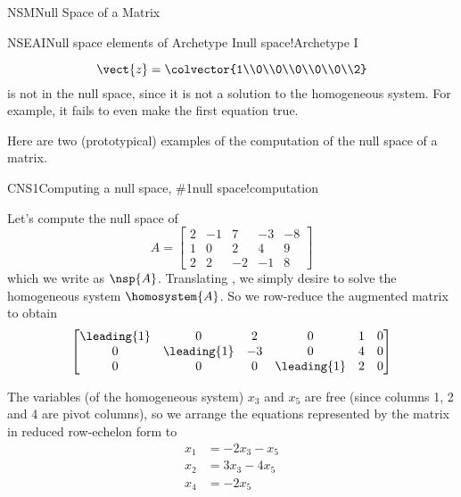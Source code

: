 \begin{subsect}{NSM}{Null Space of a Matrix}
\begin{example}{NSEAI}{Null space elements of Archetype I}{null space!Archetype I}
\begin{para}
%
\begin{equation*}
\vect{z}=\colvector{1\\0\\0\\0\\0\\0\\2}
\end{equation*}
%
is not in the null space, since it is not a solution to the homogeneous system.  For example, it fails to even make the first equation true.\end{para}
%
\end{example}
%
\begin{para}Here are two (prototypical) examples of the computation of the null space of a matrix.\end{para}
%
\begin{example}{CNS1}{Computing a null space, \protect\#1}{null space!computation}
\begin{para}Let's compute the null space of
%
\begin{equation*}
A=\begin{bmatrix}
 2 & -1 & 7 & -3 & -8 \\
 1 & 0 & 2 & 4 & 9 \\
 2 & 2 & -2 & -1 & 8
\end{bmatrix}
\end{equation*}
%
which we write as $\nsp{A}$.   Translating , we simply desire to solve the homogeneous system $\homosystem{A}$.  So we row-reduce the augmented matrix to obtain
%
\begin{equation*}
\begin{bmatrix}
 \leading{1} & 0 & 2 & 0 & 1 & 0 \\
 0 & \leading{1} & -3 & 0 & 4 & 0 \\
 0 & 0 & 0 & \leading{1} & 2 & 0
\end{bmatrix}
\end{equation*}
\end{para}
%
\begin{para}The variables (of the homogeneous system) $x_3$ and $x_5$ are free (since columns 1, 2 and 4 are pivot columns), so we arrange the equations represented by the matrix in reduced row-echelon form to
%
\begin{align*}
x_1&=-2x_3-x_5\\
x_2&=3x_3-4x_5\\
x_4&=-2x_5\\
\end{align*}

\end{para}
\end{example}
\end{subsect}
